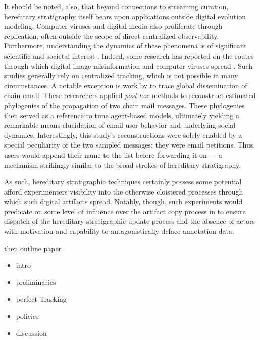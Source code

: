It should be noted, also, that beyond connections to streaming curation, hereditary stratigraphy itself bears upon applications outside digital evolution modeling.
Computer viruses and digital media also proliferate through replication, often outside the scope of direct centralized observability.
Furthermore, understanding the dynamics of these phenomena is of significant scientific and societal interest \citep{aslan2020comprehensive,dupuis2019spread,ling2021dissecting}.
Indeed, some research has reported on the routes through which digital image misinformation and computer viruses spread \citep{friggeri2014rumor,cohen1987computer}.
Such studies generally rely on centralized tracking, which is not possible in many circumstances.
A notable exception is work by \cite{libennowell2008tracing} to trace global dissemination of chain email.
These researchers applied \textit{post-hoc} methods to reconstruct estimated phylogenies of the propagation of two chain mail messages.
These phylogenies then served as a reference to tune agent-based models, ultimately yielding a remarkable means elucidation of email user behavior and underlying social dynamics.
Interestingly, this study's reconstructions were solely enabled by a special peculiarity of the two sampled messages: they were email petitions.
Thus, users would append their name to the list before forwarding it on --- a mechanism strikingly similar to the broad strokes of hereditary stratigraphy.

As such, hereditary stratigraphic techniques certainly possess some potential afford experimenters visibility into the otherwise cloistered processes through which such digital artifacts spread.
Notably, though, such experiments would predicate on some level of influence over the artifact copy process in to ensure dispatch of the hereditary stratigraphic update process and the absence of actors with motivation and capability to antagonistically deface annotation data.



then outline paper
\begin{itemize}
\item intro
\item preliminaries
\item perfect Tracking
\item policies
\item discussion
\end{itemize}

